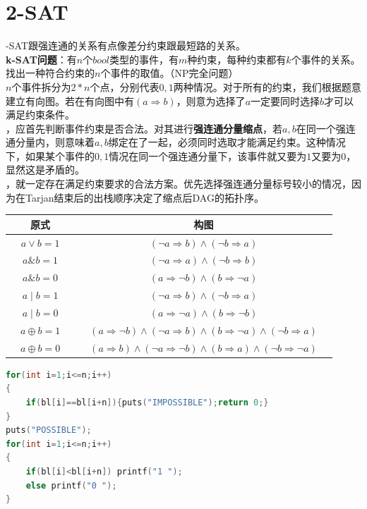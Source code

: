 \documentclass[a4paper]{book}
\begin{document}
\section{2-SAT}
-SAT跟强连通的关系有点像差分约束跟最短路的关系。\\
\indent\textbf{k-SAT问题}：有$n$个$bool$类型的事件，有$m$种约束，每种约束都有$k$个事件的关系。找出一种符合约束的$n$个事件的取值。（NP完全问题）\\
$n$个事件拆分为$2*n$个点，分别代表$0,1$两种情况。对于所有的约束，我们根据题意建立有向图。若在有向图中有$(a\Rightarrow b)$，则意为选择了$a$一定要同时选择$b$才可以满足约束条件。\\
，应首先判断事件约束是否合法。对其进行\textbf{强连通分量缩点}，若$a,b$在同一个强连通分量内，则意味着$a,b$绑定在了一起，必须同时选取才能满足约束。这种情况下，如果某个事件的$0,1$情况在同一个强连通分量下，该事件就又要为$1$又要为$0$，显然这是矛盾的。\\
，就一定存在满足约束要求的合法方案。优先选择强连通分量标号较小的情况，因为在Tarjan结束后的出栈顺序决定了缩点后DAG的拓扑序。
\begin{center}
\begin{tabular}{|c|c|}
\hline 
原式 & 构图\\
\hline 
$a\lor b=1$ & $(\neg a\Rightarrow b)\land(\neg b\Rightarrow a)$\\
\hline 
$a \& b=1$ & $(\neg a\Rightarrow a)\land(\neg b\Rightarrow b)$ \\
\hline 
$a \& b=0$ & $(a\Rightarrow \neg b)\land(b\Rightarrow \neg a)$ \\
\hline
$a \mid b=1$ & $(\neg a\Rightarrow b)\land(\neg b\Rightarrow a)$  \\
\hline
$a \mid b=0$ & $(a\Rightarrow \neg a)\land(b\Rightarrow \neg b)$\\
\hline
$a\oplus b=1$ & $(a\Rightarrow \neg b)\land(\neg a\Rightarrow b)\land(b \Rightarrow \neg a)\land(\neg b\Rightarrow a)$\\
\hline
$\quad a\oplus b=0 \quad$ & $\quad (a\Rightarrow b)\land(\neg a\Rightarrow \neg b)\land(b \Rightarrow a)\land(\neg b\Rightarrow \neg a)\quad$\\
\hline
\end{tabular}    
\end{center}

\begin{lstlisting}[language=c++]
for(int i=1;i<=n;i++)
{
    if(bl[i]==bl[i+n]){puts("IMPOSSIBLE");return 0;}
}
puts("POSSIBLE");
for(int i=1;i<=n;i++)
{
    if(bl[i]<bl[i+n]) printf("1 ");
    else printf("0 ");
}
\end{lstlisting}
\end{document}
